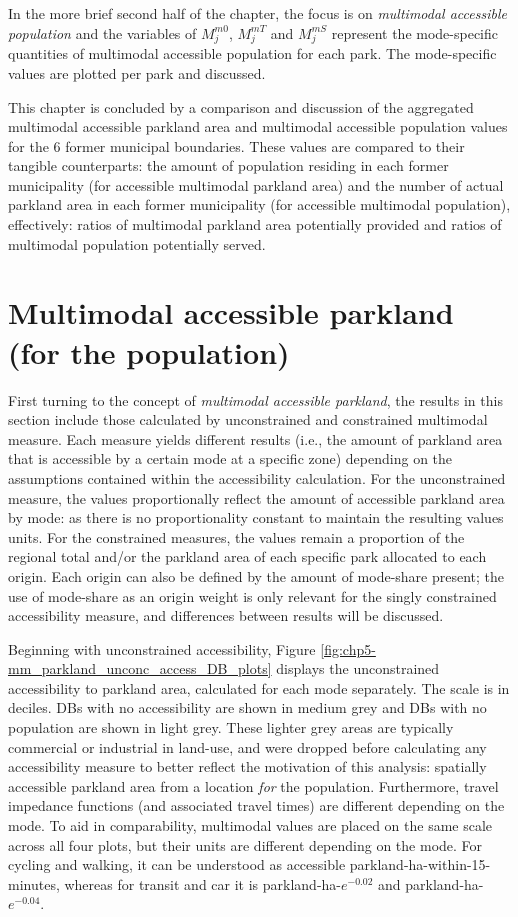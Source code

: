 \documentclass[
11pt, %
oneside, %
english, %
singlespacing, %
]{macthesis} %
\begin{document}
In the more brief second half of the chapter, the focus is on \emph{multimodal accessible population} and the variables of \(M^{m0}_j\), \(M^{mT}_j\) and \(M^{mS}_j\) represent the mode-specific quantities of multimodal accessible population for each park. The mode-specific values are plotted per park and discussed.

This chapter is concluded by a comparison and discussion of the aggregated multimodal accessible parkland area and multimodal accessible population values for the 6 former municipal boundaries. These values are compared to their tangible counterparts: the amount of population residing in each former municipality (for accessible multimodal parkland area) and the number of actual parkland area in each former municipality (for accessible multimodal population), effectively: ratios of multimodal parkland area potentially provided and ratios of multimodal population potentially served.

\section{Multimodal accessible parkland (for the population)}\label{multimodal-accessible-parkland-for-the-population}

First turning to the concept of \emph{multimodal accessible parkland}, the results in this section include those calculated by unconstrained and constrained multimodal measure. Each measure yields different results (i.e., the amount of parkland area that is accessible by a certain mode at a specific zone) depending on the assumptions contained within the accessibility calculation. For the unconstrained measure, the values proportionally reflect the amount of accessible parkland area by mode: as there is no proportionality constant to maintain the resulting values units. For the constrained measures, the values remain a proportion of the regional total and/or the parkland area of each specific park allocated to each origin. Each origin can also be defined by the amount of mode-share present; the use of mode-share as an origin weight is only relevant for the singly constrained accessibility measure, and differences between results will be discussed.

Beginning with unconstrained accessibility, Figure \ref{fig:chp5-mm_parkland_unconc_access_DB_plots} displays the unconstrained accessibility to parkland area, calculated for each mode separately. The scale is in deciles. DBs with no accessibility are shown in medium grey and DBs with no population are shown in light grey. These lighter grey areas are typically commercial or industrial in land-use, and were dropped before calculating any accessibility measure to better reflect the motivation of this analysis: spatially accessible parkland area from a location \emph{for} the population. Furthermore, travel impedance functions (and associated travel times) are different depending on the mode. To aid in comparability, multimodal values are placed on the same scale across all four plots, but their units are different depending on the mode. For cycling and walking, it can be understood as accessible parkland-ha-within-15-minutes, whereas for transit and car it is parkland-ha-\(e^{-0.02}\) and parkland-ha-\(e^{-0.04}\).
\end{document}
